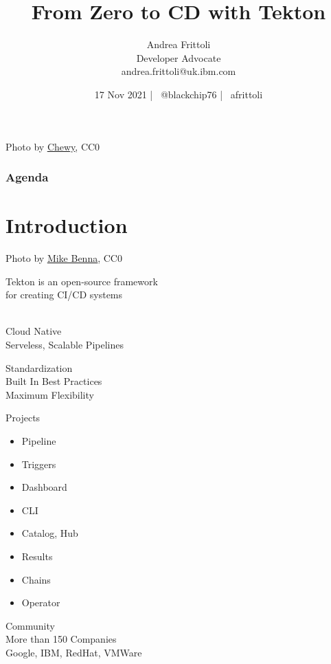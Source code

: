 \documentclass[aspectratio=169,11pt,hyperref={colorlinks=true}]{beamer}
\title{From Zero to CD with Tekton}
\date[17 Nov 2021 IBM Community Festival]{17 Nov 2021 | \faTwitter ~@blackchip76 | \faGithub ~afrittoli}
\author[Andrea Frittoli]{%
  Andrea Frittoli \\
  Developer Advocate \\
  andrea.frittoli@uk.ibm.com \\
}
\begin{document}
\begin{frame}
\titlepage{}
\end{frame}

\begin{lpicrblack}{%
  Photo by \href{https://unsplash.com/@chewy}{\underline{Chewy}}, CC0
  }%
  {%
  \tableofcontents
  }%
  {}
  \frametitle{Agenda}
\end{lpicrblack}

\section[Introduction]{Introduction}

\begin{sectionwithpic}{Photo by \href{https://unsplash.com/@mbenna}{\underline{Mike Benna}}, CC0}
\end{sectionwithpic}

\begin{stripedframe}%
  {%
  Tekton is an open-source framework \\ for creating CI/CD systems \\ ~
  }%
  {%
  Cloud Native \\
  \vspace{0.03\textheight}
  Serveless, Scalable Pipelines \\
  \vspace{0.1\textheight}
  \centering
  
  }%
  {%
  Standardization \\
  \vspace{0.03\textheight}
  Built In Best Practices \\
  \vspace{0.03\textheight}
  Maximum Flexibility \\
  }%
  {%
  Projects \\
  \vspace{0.01\textheight}
  \begin{itemize}
    \item Pipeline
    \item Triggers
    \item Dashboard
    \item CLI
    \item Catalog, Hub
    \item Results
    \item Chains
    \item Operator
  \end{itemize}
  }%
  {%
  Community \\
  \vspace{0.03\textheight}
  More than 150 Companies \\
  \vspace{0.01\textheight}
  Google, IBM, RedHat, VMWare
  }%
\end{stripedframe}
\end{document}
